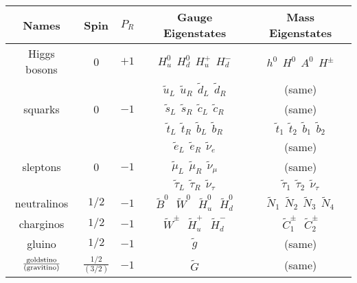 \documentclass{ws-procs9x6}
\def\stilde{\widetilde}
\begin{document}
\renewcommand{\arraystretch}{1.4}
\begin{table}
{\begin{tabular}{|c|c|c|c|c|}
\hline
Names & Spin & $P_R$ & Gauge Eigenstates & Mass Eigenstates \\
\hline\hline
Higgs bosons & 0 & $+1$ & 
$H_u^0\>\> H_d^0\>\> H_u^+ \>\> H_d^-$ 
& 
$h^0\>\> H^0\>\> A^0 \>\> H^\pm$
\\ \hline
& & &${\stilde u}_L\>\> {\stilde u}_R\>\> \stilde d_L\>\> \stilde d_R$&(same)
\\
squarks& 0&$-1$& ${\stilde s}_L\>\> {\stilde s}_R\>\> \stilde c_L\>\>
\stilde c_R$& (same) \\
& & &
$\stilde t_L \>\>\stilde t_R \>\>\stilde b_L\>\> \stilde b_R$ 
&
${\stilde t}_1\>\> {\stilde t}_2\>\> \stilde b_1\>\> \stilde b_2$
\\ \hline
& & &${\stilde e}_L\>\> {\stilde e}_R \>\>\stilde \nu_e$&(same) 
\\
sleptons& 0&$-1$&${\stilde \mu}_L\>\>{\stilde \mu}_R\>\>\stilde\nu_\mu$&(same)
\\
& & &
$\stilde \tau_L\>\> \stilde \tau_R \>\>\stilde \nu_\tau$ 
&
${\stilde \tau}_1 \>\>{\stilde \tau}_2 \>\>\stilde \nu_\tau$
\\
\hline
neutralinos & $1/2$&$-1$ & 
$\stilde B^0 \>\>\>\stilde W^0\>\>\> \stilde H_u^0\>\>\> \stilde H_d^0$   
&
$\stilde N_1\>\> \stilde N_2 \>\>\stilde N_3\>\> \stilde N_4$ 
\\
\hline
charginos & $1/2$&$-1$ & 
$\stilde W^\pm\>\>\> \stilde H_u^+ \>\>\>\stilde H_d^-$ 
&
$\stilde C_1^\pm\>\>\>\stilde C_2^\pm $ 
\\
\hline
gluino & $1/2$&$-1$ &$\stilde g$  &(same) \\
\hline
$\frac{{\rm goldstino}}{{\rm (gravitino)}}$ & $\frac{1/2}{(3/2)}$&$-1$&$\stilde 
G$  &(same) \\
\hline
\end{tabular} }
\label{tab:MSSM_particles}
\end{table}
\renewcommand{\arraystretch}{1.0}
\end{document}
